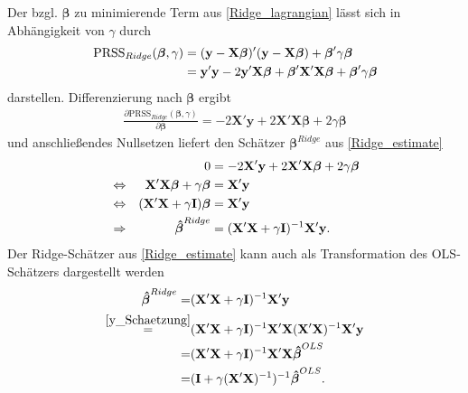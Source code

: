 \documentclass[12pt, a4paper]{report}\usepackage[]{graphicx}\usepackage[]{color}
\begin{document}
Der bzgl. $\boldsymbol{\beta}$ zu minimierende Term aus \eqref{Ridge_lagrangian} lässt sich in Abhängigkeit von $\gamma$ durch
\begin{align}\label{PRSS_Ridge}
\text{PRSS}_{Ridge}(\boldsymbol{\beta}, \gamma)&=(\mathbf{y}-\mathbf{X}\boldsymbol{\beta})'(\mathbf{y}-\mathbf{X}\boldsymbol{\beta})+\boldsymbol{\beta}'\gamma\boldsymbol{\beta} \notag \\
&=\mathbf{y}'\mathbf{y} -2\mathbf{y}'\mathbf{X}\boldsymbol{\beta}+\boldsymbol{\beta}'\mathbf{X}'\mathbf{X}\boldsymbol{\beta}+\boldsymbol{\beta}'\gamma\boldsymbol{\beta}
\end{align}
darstellen. Differenzierung nach $\boldsymbol{\beta}$ ergibt
\begin{align}\label{Ableitung_Ridge}
\frac{\partial \text{PRSS}_{Ridge}(\boldsymbol{\beta}, \gamma)}{\partial  \boldsymbol{\beta}} = -2\mathbf{X}'\mathbf{y} + 2\mathbf{X}'\mathbf{X}\boldsymbol{\beta} + 2\gamma \boldsymbol{\beta}
\end{align}
und anschließendes Nullsetzen liefert den Schätzer $\boldsymbol{\beta}^{Ridge}$ aus \eqref{Ridge_estimate}
\begin{align*}
&& 0&=-2\mathbf{X}'\mathbf{y} + 2\mathbf{X}'\mathbf{X}\boldsymbol{\beta} + 2\gamma \boldsymbol{\beta} \notag \\
&\Leftrightarrow & \mathbf{X}'\mathbf{X}\boldsymbol{\beta} + \gamma \boldsymbol{\beta} &= \mathbf{X}'\mathbf{y} \notag \\
&\Leftrightarrow & (\mathbf{X}'\mathbf{X} + \gamma \mathbf{I}) \boldsymbol{\beta} &= \mathbf{X}'\mathbf{y} \notag\\
&\Rightarrow & \boldsymbol{\hat{\beta}}^{Ridge} &= (\mathbf{X}'\mathbf{X} + \gamma \mathbf{I})^{-1}\mathbf{X}'\mathbf{y}.
\end{align*}
Der Ridge-Schätzer aus \eqref{Ridge_estimate} kann auch als Transformation des OLS-Schätzers dargestellt werden \cite{hoerl_ridge_1970}
\begin{align}\label{ridge_transformation}
\boldsymbol{\hat{\beta}}^{Ridge} =&(\mathbf{X}'\mathbf{X} + \gamma \mathbf{I})^{-1}\mathbf{X}'\mathbf{y} \notag\\
\stackrel{\eqref{y_Schaetzung}}{=}&(\mathbf{X}'\mathbf{X} + \gamma \mathbf{I})^{-1} \mathbf{X}'\mathbf{X} (\mathbf{X}'\mathbf{X})^{-1}\mathbf{X}'\mathbf{y} \notag\\
=&(\mathbf{X}'\mathbf{X} + \gamma \mathbf{I})^{-1} \mathbf{X}'\mathbf{X} \boldsymbol{\hat{\beta}}^{OLS} \notag\\
=&(\mathbf{I} + \gamma (\mathbf{X}'\mathbf{X})^{-1})^{-1}  \boldsymbol{\hat{\beta}}^{OLS}.
\end{align}
\end{document}
